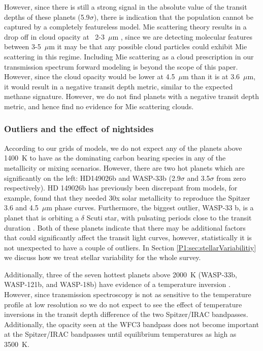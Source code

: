 However, since there is still a strong signal in the absolute value of the transit depths of these planets (5.9$\sigma$), there is indication that the population cannot be captured by a completely featureless model. Mie scattering theory results in a drop off in cloud opacity at ~2-3~$\mu$m \citep[e.g.,][]{Benneke2019}, since we are detecting molecular features between 3-5~$\mu$m it may be that any possible cloud particles could exhibit Mie scattering in this regime. Including Mie scattering as a cloud prescription in our transmission spectrum forward modeling is beyond the scope of this paper. However, since the cloud opacity would be lower at 4.5~$\mu$m than it is at 3.6~$\mu$m, it would result in a negative transit depth metric, similar to the expected methane signature. However, we do not find planets with a negative transit depth metric, and hence find no evidence for Mie scattering clouds.


\subsubsection{Outliers and the effect of nightsides}
\label{P1:subsec:additionaleffects}

According to our grids of models, we do not expect any of the planets above 1400~K to have  as the dominating carbon bearing species in any of the metallicity or mixing scenarios. However, there are two hot planets which are significantly on the left: HD149026b and WASP-33b (2.9$\sigma$ and 3.5$\sigma$ from zero respectively). HD 149026b has previously been discrepant from models, for example, \citet{Zhang2018a} found that they needed 30x solar metallicity to reproduce the Spitzer 3.6 and 4.5~$\mu$m phase curves. Furthermore, the biggest outlier, WASP-33 b, is a planet that is orbiting a $\delta$ Scuti star, with pulsating periods close to the transit duration \citep{Herrero2011}. Both of these planets indicate that there may be additional factors that could significantly affect the transit light curves, however, statistically it is not unexpected to have a couple of outliers. In Section \ref{P1:sec:stellarVariabilitiy} we discuss how we treat stellar variability for the whole survey.

Additionally, three of the seven hottest planets above 2000~K (WASP-33b, WASP-121b, and WASP-18b) have evidence of a temperature inversion \citep{vonEssen2015, Haynes2015, Evans2017, Arcangeli2018}. However, since transmission spectroscopy is not as sensitive to the temperature profile at low resolution \citep[e.g.,][]{Brown2001} so we do not expect to see the effect of temperature inversions in the transit depth difference of the two Spitzer/IRAC bandpasses. Additionally, the  opacity seen at the WFC3 bandpass \citep[e.g.][]{Arcangeli2018} does not become important at the Spitzer/IRAC bandpasses until equilibrium temperatures as high as 3500~K.


